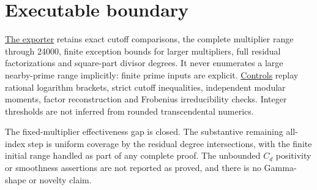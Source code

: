 \documentclass[11pt]{article}
\begin{document}
\section{Executable boundary}
\href{effective_residual_windows.py}{The exporter} retains exact cutoff
comparisons, the complete multiplier range through 24000, finite exception
bounds for larger multipliers, full residual factorizations and
square-part divisor degrees. It never enumerates a large nearby-prime
range implicitly: finite prime inputs are explicit.
\href{verify_effective_residual_windows.py}{Controls} replay rational
logarithm brackets, strict cutoff inequalities, independent modular moments,
factor reconstruction and Frobenius irreducibility checks. Integer
thresholds are not inferred from rounded transcendental numerics.

The fixed-multiplier effectiveness gap is closed. The substantive remaining
all-index step is uniform coverage by the residual degree intersections,
with the finite initial range handled as part of any complete proof.
The unbounded $C_d$ positivity or smoothness assertions are not reported as
proved, and there is no Gamma-shape or novelty claim.
\end{document}
